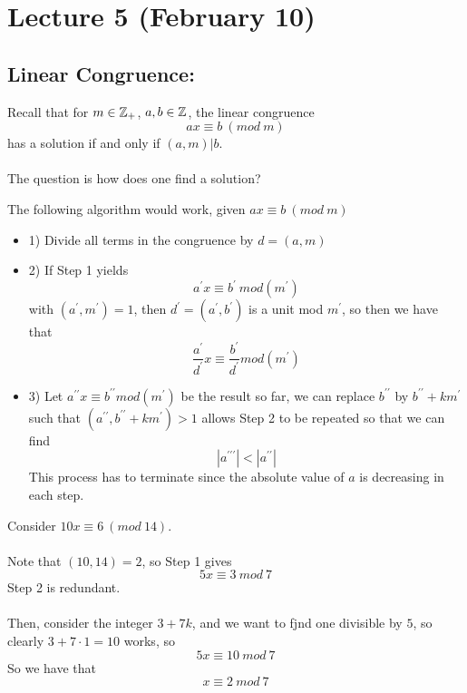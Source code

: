 \section{Lecture 5 (February 10)}

\subsection{Linear Congruence:}
Recall that for $m \in \mathbb{Z}_+$, $a, b \in \mathbb{Z}$, the linear congruence
\[ax \equiv b\ (mod\ m)\]
has a solution if and only if $(a, m) | b$.\\\\
The question is how does one find a solution?

\begin{proposition}
The following algorithm would work, given $ax \equiv b\ (mod\ m)$
\begin{itemize}
    \item 1) Divide all terms in the congruence by $d = (a, m)$
    \item 2) If Step 1 yields
    \[a^\prime x \equiv b^\prime\ mod(m^\prime)\]
    with $(a^\prime, m^\prime) = 1$, then $d^\prime = (a^\prime, b^\prime)$ is a unit mod $m^\prime$, so then we have that
    \[\frac{a^\prime}{d^\prime} x \equiv \frac{b^\prime}{d^\prime} mod(m^\prime)\]
    \item 3) Let $a^{\prime \prime} x \equiv b^{\prime \prime} mod(m^\prime)$ be the result so far, we can replace $b^{\prime \prime}$ by $b^{\prime \prime} + km^{\prime}$ such that $(a^{\prime \prime}, b^{\prime \prime} + k m^{\prime}) > 1$ allows Step 2 to be repeated so that we can find
    \[|a^{\prime \prime \prime}| < |a^{\prime \prime}|\]
    This process has to terminate since the absolute value of $a$ is decreasing in each step.
\end{itemize}
\end{proposition}

\begin{example}
Consider $10x \equiv 6\ (mod\ 14)$.\\\\
Note that $(10, 14) = 2$, so Step 1 gives
\[5x \equiv 3\ mod\ 7\]
Step 2 is redundant.\\\\
Then, consider the integer $3 + 7k$, and we want to fjnd one divisible by $5$, so clearly $3 + 7 \cdot 1 = 10$ works, so
\[5x \equiv 10\ mod\ 7\]
So we have that
\[x \equiv 2\ mod\ 7\]
\end{example}

